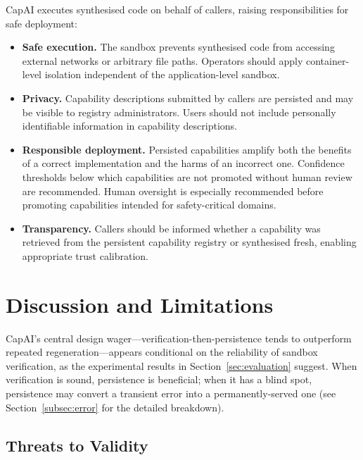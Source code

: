 \documentclass[conference]{IEEEtran}
\begin{document}
CapAI executes synthesised code on behalf of callers, raising
responsibilities for safe deployment:

\begin{itemize}
  \item \textbf{Safe execution.} The sandbox prevents synthesised code
        from accessing external networks or arbitrary file paths.
        Operators should apply container-level isolation independent of
        the application-level sandbox.

  \item \textbf{Privacy.} Capability descriptions submitted by callers
        are persisted and may be visible to registry administrators.
        Users should not include personally identifiable information in
        capability descriptions.

  \item \textbf{Responsible deployment.} Persisted capabilities amplify
        both the benefits of a correct implementation and the harms of
        an incorrect one.
        Confidence thresholds below which capabilities are not promoted
        without human review are recommended.
        Human oversight is especially recommended before promoting
        capabilities intended for safety-critical domains.

  \item \textbf{Transparency.} Callers should be informed whether a
        capability was retrieved from the persistent capability registry
        or synthesised fresh, enabling appropriate trust calibration.
\end{itemize}

\section{Discussion and Limitations}
\label{sec:discussion}

CapAI's central design wager---verification-then-persistence tends to
outperform repeated regeneration---appears conditional on the reliability
of sandbox verification, as the experimental results in
Section~\ref{sec:evaluation} suggest.
When verification is sound, persistence is beneficial; when it has a blind
spot, persistence may convert a transient error into a permanently-served
one (see Section~\ref{subsec:error} for the detailed breakdown).

\subsection{Threats to Validity}
\label{sec:threats}
\end{document}
